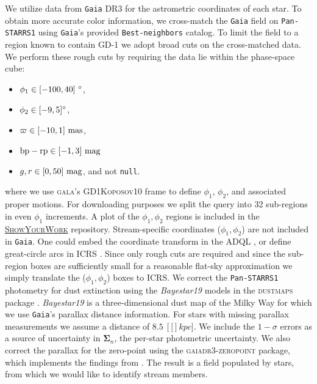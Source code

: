 \documentclass[twocolumn]{aastex631}
\newcommand{\code}[1]{\textsc{#1}}
\newcommand{\package}[1]{\code{#1}}
\newcommand{\stream}[1]{#1}
\newcommand{\dataarchive}[1]{\texttt{#1}}
\newcommand{\Gaia}{\dataarchive{Gaia}}
\newcommand{\PanStarrs}{\dataarchive{Pan-STARRS1}}
\newcommand{\mbs}[1]{\boldsymbol{#1}}
\newcommand{\unit}[1]{[\text{#1}]}
\newcommand{\parallax}{\varpi}
\begin{document}
        We utilize data from \Gaia{} DR3 for the astrometric coordinates of each
        star.  To obtain more accurate color information, we cross-match the
        \Gaia{} field on \PanStarrs{} \citep{PanSTARRS1} using \Gaia's provided
        \texttt{Best-neighbors} catalog.  To limit the field to a region known
        to contain \stream{GD-1} we adopt broad cuts on the cross-matched data.
        We perform these rough cuts by requiring the data lie within the
        phase-space cube:
        \begin{itemize}
            \item $\phi_1 \in [-100, 40] \ \rm{\degree}$,
            \item $\phi_2 \in [-9, 5] \rm{\degree}$,
            \item $\parallax \in [-10, 1] \ \rm{mas}$,
            \item $\rm{bp-rp} \in [-1, 3] \ \rm{mag}$
            \item $g, r \in [0, 50] \ \rm{mag}$, and not \texttt{null}.
        \end{itemize}
        where we use \package{gala}'s \citep{gala, galav1.3}
        \code{GD1Koposov10} frame \citep{Koposov+2010} to define $\phi_1$,
        $\phi_2$, and associated proper motions.  For downloading purposes we
        split the query into 32 sub-regions in even $\phi_1$ increments.
        A plot of the $\phi_1, \phi_2$ regions is included in the
        \href{\GitHubURL{}}{\package{ShowYourWork}} repository.  Stream-specific
        coordinates ($\phi_1, \phi_2$) are not included in \Gaia.  One could
        embed the coordinate transform in the ADQL \citep{ADQL2.0}, or define
        great-circle arcs in ICRS \citep{ICRS1997}. Since only rough cuts are
        required and since the sub-region boxes are sufficiently small for a
        reasonable flat-sky approximation  we simply translate the ($\phi_1,
        \phi_2$) boxes to ICRS.  We correct the \PanStarrs{} photometry for dust
        extinction using the \textit{Bayestar19} \citep{Green+2019} models in
        the \package{dustmaps} package \citep{Green2018}.  \textit{Bayestar19}
        is a three-dimensional dust map of the Milky Way for which we use
        \Gaia's parallax distance information. For stars with missing parallax measurements we assume a distance of $8.5 \ \unit[kpc]$.  We include the $1-\sigma$ errors
        as a source of uncertainty in $\mbs{\Sigma}_n$, the per-star photometric
        uncertainty.
        We also correct the parallax for the zero-point using the \code{gaiadr3-zeropoint} package, which implements the findings from \cite{Lindegren+2021}.
        The result is a field populated by
         stars, from which we would like
        to identify stream members.
\end{document}
